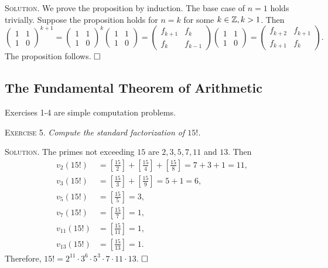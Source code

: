 \documentclass[11pt, leqno]{article}
\newcommand{\done}{\ensuremath{\hfill\square}}
\begin{document}
\textsc{Solution}. We prove the proposition by induction. The base case of $n=1$ holds trivially. Suppose the proposition holds for $n=k$ for some $k\in\mathbb{Z}, k>1$. Then 
\begin{displaymath}
\begin{pmatrix} 1 & 1 \\ 1 & 0 \end{pmatrix}^{k+1} = \begin{pmatrix} 1 & 1 \\ 1 & 0 \end{pmatrix}^k \begin{pmatrix} 1 & 1 \\ 1 & 0 \end{pmatrix} = \begin{pmatrix} f_{k+1} & f_k \\ f_k & f_{k-1} \end{pmatrix} \begin{pmatrix} 1 & 1 \\ 1 & 0 \end{pmatrix} = \begin{pmatrix} f_{k+2} & f_{k+1} \\ f_{k+1} & f_k \end{pmatrix}.
\end{displaymath}
The proposition follows. \done

\subsection{The Fundamental Theorem of Arithmetic}

Exercises 1-4 are simple computation problems.

\textsc{Exercise 5}. \emph{Compute the standard factorization of $15!$.}

\textsc{Solution}. The primes not exceeding $15$ are $2, 3, 5, 7, 11 $ and $13$. Then 
\begin{align*}
  v_2(15!) &= \left[\frac{15}{2}\right] + \left[\frac{15}{4}\right] + \left[\frac{15}{8}\right] = 7 + 3 + 1 = 11, \\
  v_3(15!) &= \left[\frac{15}{3}\right] + \left[\frac{15}{9}\right] = 5 + 1 = 6,\\
  v_5(15!) &= \left[\frac{15}{5}\right] = 3, \\
  v_7(15!) &= \left[\frac{15}{7}\right] = 1, \\
  v_{11}(15!) &= \left[\frac{15}{11}\right] = 1, \\
  v_{13}(15!) &= \left[\frac{15}{13}\right] = 1.
\end{align*}
Therefore, $15! = 2^{11}\cdot 3^6\cdot 5^3\cdot 7 \cdot 11 \cdot 13$. \done
\end{document}
